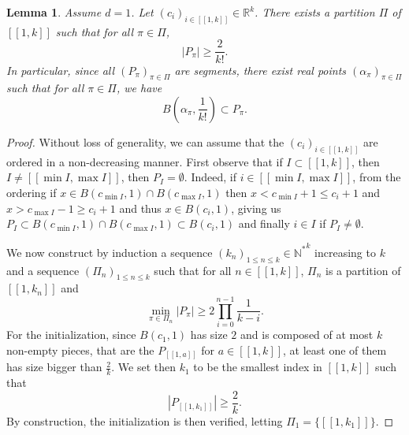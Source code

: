 \documentclass[a4paper, 11pt]{article}
\theoremstyle{plain}
\newtheorem{Lemma}[Theorem]{Lemma}
\theoremstyle{definition}
\newcommand{\R}{\mathbb{R}}
\newcommand{\N}{\mathbb{N}}
\newcommand{\range}[2]{[\![#1,#2]\!]}
\numberwithin{equation}{section}
\begin{document}
\begin{Lemma}
    \label{lemma_dim_1} 
    Assume $d=1$. Let $(c_i)_{i\in\range{1}{k}}\in\R^k$. There exists a partition $\Pi$ of $\range{1}{k}$ such that for all $\pi\in\Pi$,
        $$|P_\pi|\geq\frac{2}{k!}.$$
    In particular, since all $(P_\pi)_{\pi\in\Pi}$ are segments, there exist real points $(\alpha_\pi)_{\pi\in\Pi}$ such that for all $\pi\in\Pi$, we have
        $$B\left(\alpha_\pi,\frac{1}{k!}\right)\subset P_\pi.$$
\end{Lemma}

\begin{proof}
    Without loss of generality, we can assume that the $(c_i)_{i\in\range{1}{k}}$ are ordered in a non-decreasing manner. First observe that if $I\subset\range{1}{k}$, then $I\neq\range{\min I}{\max I}$, then $P_I=\emptyset$. Indeed, if $i\in\range{\min I}{\max I}$, from the ordering if $x\in B(c_{\min I},1)\cap B(c_{\max I}, 1)$ then $x<c_{\min I}+1\leq c_i+1$ and $x>c_{\max I}-1\geq c_i+1$ and thus $x\in B(c_i,1)$, giving us $P_I\subset B(c_{\min I},1)\cap B(c_{\max I}, 1)\subset B(c_i,1)$ and finally $i\in I$ if $P_I\neq\emptyset$.

    We now construct by induction a sequence $(k_n)_{1\leq n\leq k}\in{\N^*}^k$ increasing to $k$ and a sequence $(\Pi_n)_{1\leq n\leq k}$ such that for all $n\in\range{1}{k}$, $\Pi_n$ is a partition of $\range{1}{k_n}$ and
        \begin{equation}
            \label{eq_piece_size}
            \min_{\pi\in\Pi_n}|P_\pi|\geq2\prod_{i=0}^{n-1}\frac{1}{k-i}.
        \end{equation}
    For the initialization, since $B(c_1, 1)$ has size $2$ and is composed of at most $k$ non-empty pieces, that are the $P_{\range{1}{a}}$ for $a\in\range{1}{k}$, at least one of them has size bigger than $\frac{2}{k}$. We set then $k_1$ to be the smallest index in $\range{1}{k}$ such that
        $$|P_{\range{1}{k_1}}|\geq\frac{2}{k}.$$
    By construction, the initialization is then verified, letting $\Pi_1=\{\range{1}{k_1}\}$.


\end{proof}
\end{document}

